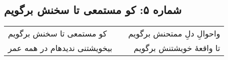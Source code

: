\begin{center}
\section*{شماره ۵: کو مستمعی تا سخنش برگویم}
\label{sec:005}
\begin{longtable}{l p{0.5cm} r}
کو مستمعی تا سخنش برگویم
&&
واحوالِ دلِ ممتحنش برگویم
\\
بیخویشتنی ندیدهام در همه عمر
&&
تا واقعهٔ خویشتنش برگویم
\\
\end{longtable}
\end{center}
